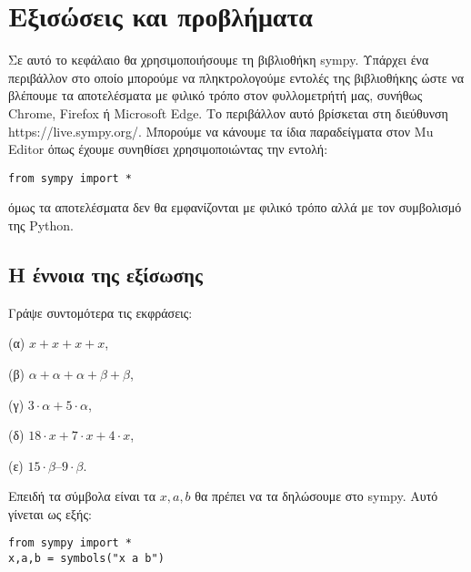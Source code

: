 \chapter{Εξισώσεις και προβλήματα}

Σε αυτό το κεφάλαιο θα χρησιμοποιήσουμε τη βιβλιοθήκη sympy.
Υπάρχει ένα περιβάλλον στο οποίο μπορούμε να πληκτρολογούμε εντολές της βιβλιοθήκης ώστε να βλέπουμε τα αποτελέσματα με φιλικό τρόπο στον φυλλομετρήτή μας, συνήθως Chrome, Firefox ή Microsoft Edge. Το περιβάλλον αυτό βρίσκεται στη διεύθυνση https://live.sympy.org/. Μπορούμε να κάνουμε τα ίδια παραδείγματα στον Mu Editor όπως έχουμε συνηθίσει χρησιμοποιώντας την εντολή:
\begin{lstlisting}
from sympy import *
\end{lstlisting}
όμως τα αποτελέσματα δεν θα εμφανίζονται με φιλικό τρόπο αλλά με τον συμβολισμό της Python.
\section{Η έννοια της εξίσωσης}
\begin{exercise}
Γράψε συντομότερα τις εκφράσεις:

(α) $x + x + x + x$, 

(β) $\alpha + \alpha + \alpha + \beta + \beta$, 

(γ) $3\cdot \alpha + 5 \cdot \alpha$, 

(δ) $18 \cdot x + 7 \cdot x + 4 \cdot x$, 

(ε) $15 \cdot \beta – 9 \cdot \beta$.
\end{exercise}

Επειδή τα σύμβολα είναι τα $x, a, b$ θα πρέπει να τα δηλώσουμε στο sympy. Αυτό γίνεται ως εξής:
\begin{lstlisting}
from sympy import *
x,a,b = symbols("x a b")
\end{lstlisting}

